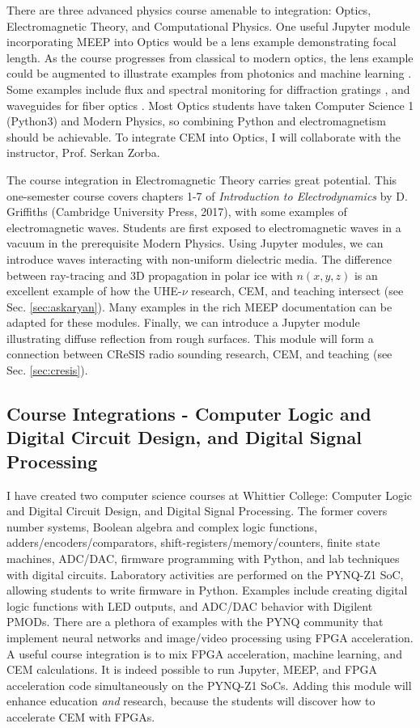 \documentclass[11pt]{amsart}
\begin{document}
There are three advanced physics course amenable to integration: Optics, Electromagnetic Theory, and Computational Physics.  One useful Jupyter module incorporating MEEP into Optics would be a lens example demonstrating focal length.  As the course progresses from classical to modern optics, the lens example could be augmented to illustrate examples from photonics and machine learning \cite{meepcon2022_3}.  Some examples include flux and spectral monitoring for diffraction gratings \cite{meepcon2022_4}, and waveguides for fiber optics \cite{meepcon2022_5}.  Most Optics students have taken Computer Science 1 (Python3) and Modern Physics, so combining Python and electromagnetism should be achievable.  To integrate CEM into Optics, I will collaborate with the instructor, Prof. Serkan Zorba.  

The course integration in Electromagnetic Theory carries great potential.  This one-semester course covers chapters 1-7 of \textit{Introduction to Electrodynamics} by D. Griffiths (Cambridge University Press, 2017), with some examples of electromagnetic waves.  Students are first exposed to electromagnetic waves in a vacuum in the prerequisite Modern Physics.  Using Jupyter modules, we can introduce waves interacting with non-uniform dielectric media.  The difference between ray-tracing and 3D propagation in polar ice with $n(x,y,z)$ is an excellent example of how the UHE-$\nu$ research, CEM, and teaching intersect (see Sec. \ref{sec:askaryan}).  Many examples in the rich MEEP documentation can be adapted for these modules.  Finally, we can introduce a Jupyter module illustrating diffuse reflection from rough surfaces.  This module will form a connection between CReSIS radio sounding research, CEM, and teaching (see Sec. \ref{sec:cresis}).  

\subsection{Course Integrations - Computer Logic and Digital Circuit Design, and Digital Signal Processing}

I have created two computer science courses at Whittier College: Computer Logic and Digital Circuit Design, and Digital Signal Processing.  The former covers number systems, Boolean algebra and complex logic functions, adders/encoders/comparators, shift-registers/memory/counters, finite state machines, ADC/DAC, firmware programming with Python, and lab techniques with digital circuits.  Laboratory activities are performed on the PYNQ-Z1 SoC, allowing students to write firmware in Python.  Examples include creating digital logic functions with LED outputs, and ADC/DAC behavior with Digilent PMODs.  There are a plethora of examples with the PYNQ community that implement neural networks and image/video processing using FPGA acceleration.  A useful course integration is to mix FPGA acceleration, machine learning, and CEM calculations.  It is indeed possible to run Jupyter, MEEP, and FPGA acceleration code simultaneously on the PYNQ-Z1 SoCs.  Adding this module will enhance education \textit{and} research, because the students will discover how to accelerate CEM with FPGAs.
\end{document}
